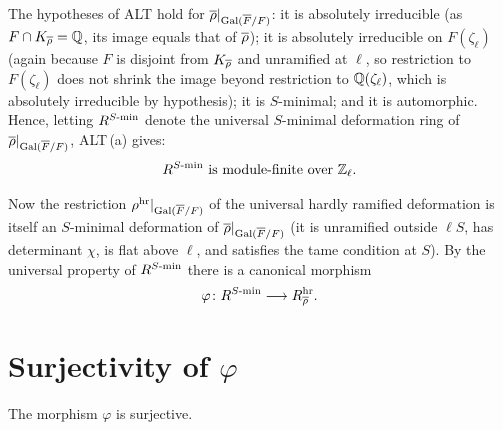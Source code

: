 \documentclass[11pt]{article}
\begin{document}
The hypotheses of ALT hold for $\overline{\rho}|_{\operatorname{Gal}(\overline{F}/F)}$: it is absolutely irreducible
(as $F\cap K_{\overline{\rho}}=\mathbb{Q}$, its image equals that of $\overline{\rho}$); it is
absolutely irreducible on $F(\zeta_\ell)$ (again because $F$ is disjoint from
$K_{\overline{\rho}}$ and unramified at $\ell$, so restriction to $F(\zeta_\ell)$ does
not shrink the image beyond restriction to $\mathbb{Q}(\zeta_\ell)$, which is absolutely
irreducible by hypothesis); it is $S$-minimal; and it is automorphic. Hence,
letting $R^{S\text{-}\mathrm{min}}$ denote the universal $S$-minimal deformation ring
of $\overline{\rho}|_{\operatorname{Gal}(\overline{F}/F)}$, ALT\,(a) gives:
\[
  R^{S\text{-}\mathrm{min}}\text{ is module-finite over }\mathbb{Z}_\ell.
\]

Now the restriction $\rho^{\mathrm{hr}}|_{\operatorname{Gal}(\overline{F}/F)}$ of the universal hardly ramified
deformation is itself an $S$-minimal deformation of $\overline{\rho}|_{\operatorname{Gal}(\overline{F}/F)}$ (it is
unramified outside $\ell S$, has determinant $\chi$, is flat above $\ell$, and
satisfies the tame condition at $S$). By the universal property of
$R^{S\text{-}\mathrm{min}}$ there is a canonical morphism
\[
  \varphi\colon R^{S\text{-}\mathrm{min}}\longrightarrow R^{\mathrm{hr}}_{\overline{\rho}}.
\]

\section{Surjectivity of $\varphi$}

\begin{proposition}\label{prop:surj}
The morphism $\varphi$ is surjective.
\end{proposition}
\end{document}
